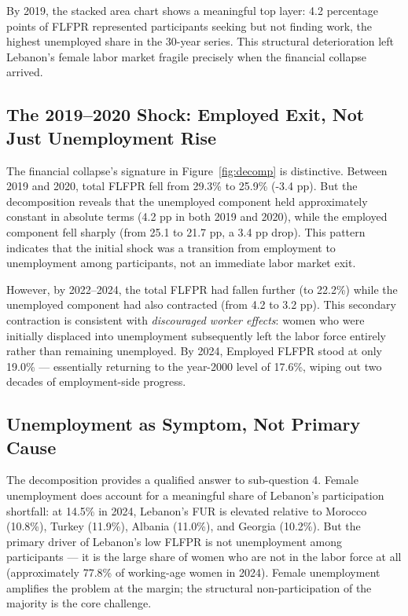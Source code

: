 \documentclass[12pt,a4paper]{article}
\begin{document}
By 2019, the stacked area chart shows a meaningful top layer: 4.2 percentage points of FLFPR represented participants seeking but not finding work, the highest unemployed share in the 30-year series. This structural deterioration left Lebanon's female labor market fragile precisely when the financial collapse arrived.

\subsection{The 2019--2020 Shock: Employed Exit, Not Just Unemployment Rise}

The financial collapse's signature in Figure~\ref{fig:decomp} is distinctive. Between 2019 and 2020, total FLFPR fell from 29.3\% to 25.9\% (-3.4 pp). But the decomposition reveals that the unemployed component held approximately constant in absolute terms (4.2 pp in both 2019 and 2020), while the employed component fell sharply (from 25.1 to 21.7 pp, a 3.4 pp drop). This pattern indicates that the initial shock was a transition from employment to unemployment among participants, not an immediate labor market exit.

However, by 2022--2024, the total FLFPR had fallen further (to 22.2\%) while the unemployed component had also contracted (from 4.2 to 3.2 pp). This secondary contraction is consistent with \textit{discouraged worker effects}: women who were initially displaced into unemployment subsequently left the labor force entirely rather than remaining unemployed. By 2024, Employed FLFPR stood at only 19.0\% --- essentially returning to the year-2000 level of 17.6\%, wiping out two decades of employment-side progress.

\subsection{Unemployment as Symptom, Not Primary Cause}

The decomposition provides a qualified answer to sub-question 4. Female unemployment does account for a meaningful share of Lebanon's participation shortfall: at 14.5\% in 2024, Lebanon's FUR is elevated relative to Morocco (10.8\%), Turkey (11.9\%), Albania (11.0\%), and Georgia (10.2\%). But the primary driver of Lebanon's low FLFPR is not unemployment among participants --- it is the large share of women who are not in the labor force at all (approximately 77.8\% of working-age women in 2024). Female unemployment amplifies the problem at the margin; the structural non-participation of the majority is the core challenge.
\end{document}
